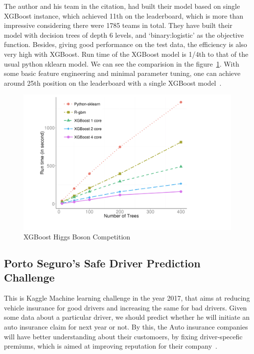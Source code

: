 The author and his team in the citation, had built their model based on single
XGBoost instance, which achieved 11th on the leaderboard, which is more than
impressive considering there were 1785 teams in total. They have built their
model with decision trees of depth 6 levels, and `binary:logistic' as the
objective function. Besides, giving good performance on the test data, the
efficiency is also very high with XGBoost. Run time of the XGBoost model is
1/4th to that of the usual python sklearn model. We can see the comparision in
the figure~\ref{s:XGBoost-runtime-comparision}. With some basic feature
engineering and minimal parameter tuning, one can achieve around 25th position
on the leaderboard with a single XGBoost model~\cite{hid-sp18-401-XGBoost-pdf}.

\begin{figure}[!ht]
        \centering\includegraphics[width=\columnwidth]
        {images/Runtime-vs-Number-of-trees.png}
        \caption{XGBoost Higgs Boson Competition}\label{s:XGBoost-runtime-comparision}
\end{figure}

\subsection{Porto Seguro's Safe Driver Prediction Challenge} 

This is Kaggle Machine learning challenge in the year 2017, that aims at
reducing vehicle insurance for good drivers and increasing the same for bad
drivers. Given some data about a particular driver, we should predict whether
he will initiate an auto insurance claim for next year or not. By this, the
Auto insurance companies  will have better understanding about their
customoers, by fixing driver-specefic premiums, which is aimed at improving
reputation for their company~\cite{hid-sp18-401-Kaggle-Porto-Seguro}.

